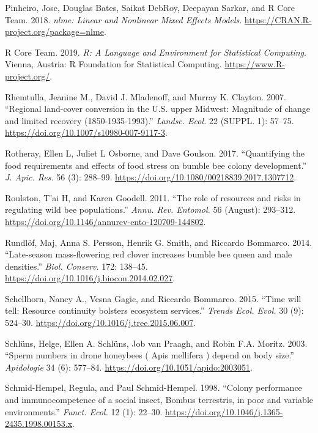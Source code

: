 \documentclass[11pt,]{article}
\begin{document}
\leavevmode\hypertarget{ref-nlme}{}%
Pinheiro, Jose, Douglas Bates, Saikat DebRoy, Deepayan Sarkar, and R
Core Team. 2018. \emph{nlme: Linear and Nonlinear Mixed Effects Models}.
\url{https://CRAN.R-project.org/package=nlme}.

\leavevmode\hypertarget{ref-rcite}{}%
R Core Team. 2019. \emph{R: A Language and Environment for Statistical
Computing}. Vienna, Austria: R Foundation for Statistical Computing.
\url{https://www.R-project.org/}.

\leavevmode\hypertarget{ref-Rhemtulla2007}{}%
Rhemtulla, Jeanine M., David J. Mladenoff, and Murray K. Clayton. 2007.
``Regional land-cover conversion in the U.S. upper Midwest: Magnitude of
change and limited recovery (1850-1935-1993).'' \emph{Landsc. Ecol.} 22
(SUPPL. 1): 57--75. \url{https://doi.org/10.1007/s10980-007-9117-3}.

\leavevmode\hypertarget{ref-Rotheray2017}{}%
Rotheray, Ellen L, Juliet L Osborne, and Dave Goulson. 2017.
``Quantifying the food requirements and effects of food stress on bumble
bee colony development.'' \emph{J. Apic. Res.} 56 (3): 288--99.
\url{https://doi.org/10.1080/00218839.2017.1307712}.

\leavevmode\hypertarget{ref-Roulston2011}{}%
Roulston, T'ai H, and Karen Goodell. 2011. ``The role of resources and
risks in regulating wild bee populations.'' \emph{Annu. Rev. Entomol.}
56 (August): 293--312.
\url{https://doi.org/10.1146/annurev-ento-120709-144802}.

\leavevmode\hypertarget{ref-Rundlof2014}{}%
Rundlöf, Maj, Anna S. Persson, Henrik G. Smith, and Riccardo Bommarco.
2014. ``Late-season mass-flowering red clover increases bumble bee queen
and male densities.'' \emph{Biol. Conserv.} 172: 138--45.
\url{https://doi.org/10.1016/j.biocon.2014.02.027}.

\leavevmode\hypertarget{ref-Schellhorn2015c}{}%
Schellhorn, Nancy A., Vesna Gagic, and Riccardo Bommarco. 2015. ``Time
will tell: Resource continuity bolsters ecosystem services.''
\emph{Trends Ecol. Evol.} 30 (9): 524--30.
\url{https://doi.org/10.1016/j.tree.2015.06.007}.

\leavevmode\hypertarget{ref-Schluns2003}{}%
Schlüns, Helge, Ellen A. Schlüns, Job van Praagh, and Robin F.A. Moritz.
2003. ``Sperm numbers in drone honeybees ( Apis mellifera ) depend on
body size.'' \emph{Apidologie} 34 (6): 577--84.
\url{https://doi.org/10.1051/apido:2003051}.

\leavevmode\hypertarget{ref-Schmid-Hempel1998a}{}%
Schmid-Hempel, Regula, and Paul Schmid-Hempel. 1998. ``Colony
performance and immunocompetence of a social insect, Bombus terrestris,
in poor and variable environments.'' \emph{Funct. Ecol.} 12 (1): 22--30.
\url{https://doi.org/10.1046/j.1365-2435.1998.00153.x}.
\end{document}
